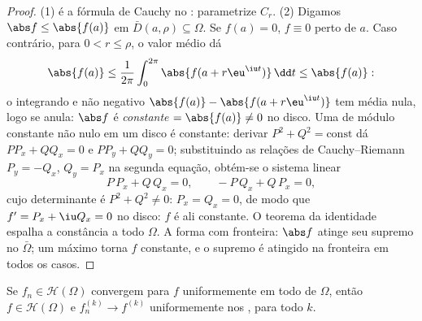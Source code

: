 \begin{proof}
(1) é a fórmula de Cauchy no : parametrize $C_r$.
(2) Digamos $\abs f \leq \abs{f(a)}$ em $\bar D(a, \rho)
\subseteq \Omega$. Se $f(a) = 0$, $f \equiv 0$ perto de $a$. Caso
contrário, para $0 < r \leq \rho$, o valor médio dá
\[
\abs{f(a)} \leq \frac1{2\pi}\int_0^{2\pi}\abs{f(a +
r\eu^{\iu t})}\,\dd t \leq \abs{f(a)} :
\]
o integrando  e não negativo $\abs{f(a)} - \abs{f(a +
r\eu^{\iu t})}$ tem média nula, logo se
anula: $\abs f$ é \emph{constante} $= \abs{f(a)} \ne 0$ no disco. Uma  de módulo constante não nulo em um disco é constante: derivar
$P^2 + Q^2 = \text{const}$ dá $PP_x + QQ_x
= 0$ e $PP_y + QQ_y = 0$; substituindo as relações de Cauchy--Riemann
$P_y = -Q_x$, $Q_y = P_x$ na segunda equação, obtém-se o sistema linear
\[
P\,P_x + Q\,Q_x = 0, \qquad -P\,Q_x + Q\,P_x = 0,
\]
cujo determinante é $P^2 + Q^2 \neq 0$: $P_x = Q_x = 0$, de modo que $f' = P_x + \iu Q_x = 0$ no disco: $f$ é
ali constante. O teorema da identidade espalha a constância a todo
$\Omega$. A forma com fronteira: $\abs f$ atinge seu supremo no
 $\bar\Omega$; um máximo  torna $f$ constante, e o supremo
é atingido na fronteira em todos os casos.
\end{proof}

\begin{theorem}
\label{thm:b3:holomorphic:weierstrassconv}
Se $f_n \in \mathcal H(\Omega)$ convergem para $f$ uniformemente em todo  de
$\Omega$, então $f \in \mathcal
H(\Omega)$ e $f_n^{(k)} \to f^{(k)}$ uniformemente nos , para todo
$k$.
\end{theorem}

